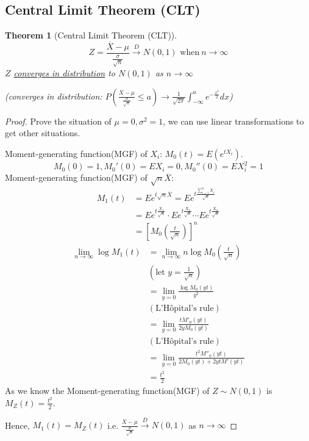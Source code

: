 \documentclass[11pt,a4paper]{article}
\newtheorem{theorem}{Theorem}
\begin{document}
\subsection{Central Limit Theorem (CLT)}
\begin{theorem}[Central Limit Theorem (CLT)]
    $$Z=\frac{\overline{X}-\mu}{\frac{\sigma}{\sqrt{n}}} \xrightarrow {D} N(0,1) \text{ when}\ n\to \infty$$
    $Z$ \underline{converges in distribution} to $N(0,1)$ as $n\to \infty$

    (converges in distribution: $P(\frac{\overline{X}-\mu}{\frac{\sigma}{\sqrt{n}}}\leq a)\rightarrow \frac{1}{\sqrt{2\pi}}\int_{-\infty}^ae^{-\frac{x^2}{2}}dx$)
\end{theorem}
\begin{proof}
    Prove the situation of $\mu=0,\sigma^2=1$, we can use linear transformations to get other situations.

    Moment-generating function(MGF) of $X_i$: $M_0(t)=E(e^{tX_i})$. $$M_0(0)=1,M_0'(0)=EX_i=0,M_0''(0)=EX_i^2=1$$
    Moment-generating function(MGF) of $\sqrt{n}\overline{X}$:
    \begin{equation}
        \begin{aligned}
            M_1(t)&=Ee^{t\sqrt{n}\overline{X}}=Ee^{t\frac{\sum_{i=1}^nX_i}{\sqrt{n}}}\\
            &=Ee^{t\frac{X_1}{\sqrt{n}}}\cdot Ee^{t\frac{X_2}{\sqrt{n}}}\cdots Ee^{t\frac{X_n}{\sqrt{n}}}\\
            &=[M_0(\frac{t}{\sqrt{n}})]^n
        \end{aligned}
        \nonumber
    \end{equation}
    \begin{equation}
        \begin{aligned}
            \lim_{n \rightarrow	\infty}\log M_1(t)&=\lim_{n \rightarrow	\infty}n\log M_0(\frac{t}{\sqrt{n}})\\
            &(\text{let }y=\frac{1}{\sqrt{n}})\\
            &=\lim_{y=0}\frac{\log M_0(yt)}{y^2}\\
            &(\text{L'Hôpital's rule})\\
            &=\lim_{y=0}\frac{t M'_0(yt)}{2y M_0(yt)}\\
            &(\text{L'Hôpital's rule})\\
            &=\lim_{y=0}\frac{t^2 M''_0(yt)}{2 M_0(yt)+2ytM'(yt)}\\
            &=\frac{t^2}{2}
        \end{aligned}
        \nonumber
    \end{equation}
    As we know the Moment-generating function(MGF) of $Z\sim N(0,1)$ is $M_Z(t)=\frac{t^2}{2}$.

    Hence, $M_1(t)=M_Z(t)$ i.e. $\frac{\overline{X}-\mu}{\frac{\sigma}{\sqrt{n}}} \xrightarrow {D} N(0,1)$ as $n \rightarrow\infty$
\end{proof}
\end{document}
